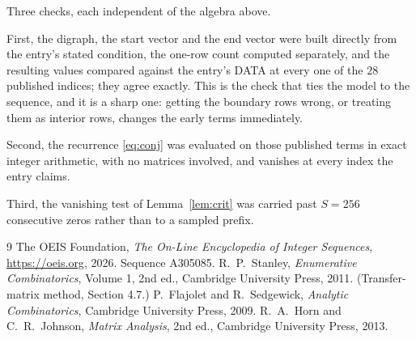 \documentclass[11pt,a4paper]{article}
\theoremstyle{plain}
\theoremstyle{definition}
\begin{document}
Three checks, each independent of the algebra above.

First, the digraph, the start vector and the end vector were built directly from the
entry's stated condition, the one-row count computed separately, and the resulting values
compared against the entry's DATA at every one of the $28$ published indices; they
agree exactly. This is the check that ties the model to the sequence, and it is a sharp one:
getting the boundary rows wrong, or treating them as interior rows, changes the early terms
immediately.

Second, the recurrence \eqref{eq:conj} was evaluated on those published terms in exact
integer arithmetic, with no matrices involved, and vanishes at every index the entry claims.

Third, the vanishing test of Lemma~\ref{lem:crit} was carried past $S=256$ consecutive
zeros rather than to a sampled prefix.

\begin{thebibliography}{9}
 The OEIS Foundation, \emph{The On-Line Encyclopedia of Integer
Sequences}, \url{https://oeis.org}, 2026. Sequence A305085.
 R.~P.~Stanley, \emph{Enumerative Combinatorics}, Volume 1, 2nd ed.,
Cambridge University Press, 2011. (Transfer-matrix method, Section 4.7.)
 P.~Flajolet and R.~Sedgewick, \emph{Analytic Combinatorics}, Cambridge
University Press, 2009.
 R.~A.~Horn and C.~R.~Johnson, \emph{Matrix Analysis}, 2nd ed., Cambridge
University Press, 2013.
\end{thebibliography}
\end{document}
